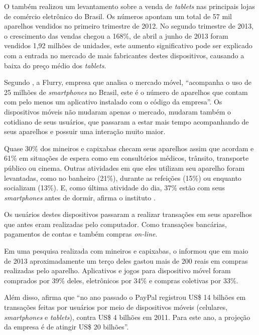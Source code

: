\documentclass[
	12pt,				%
	openright,			%
	oneside,			%
	a4paper,			%
	chapter=TITLE,		%
	section=TITLE,		%
	english,			%
	french,				%
	spanish,			%
	brazil				%
	]{abntex2}
\begin{document}
O  também realizou um levantamento sobre a venda de \textit{tablets} nas principais lojas de comércio eletrônico do Brasil. Os números apontam um total de 57 mil aparelhos vendidos no primeiro trimestre de 2012. No segundo trimestre de 2013, o crescimento das vendas chegou a 168\%, de abril a junho de 2013 foram vendidos 1,92 milhões de unidades, este aumento significativo pode ser explicado com a entrada no mercado de mais fabricantes destes dispositivos, causando a baixa do preço médio dos \textit{tablets}.

Segundo , a Flurry, empresa que analisa o mercado móvel, “acompanha o uso de 25 milhões de \textit{smartphones} no Brasil, este é o número de aparelhos que contam com pelo menos um aplicativo instalado com o código da empresa”. Os dispositivos móveis não mudaram apenas o mercado, mudaram também o cotidiano de seus usuários, que passaram a estar mais tempo acompanhando de seus aparelhos e possuir uma interação muito maior. 

\begin{citacao}
Quase 30\% dos mineiros e capixabas checam seus aparelhos assim que acordam e 61\% em situações de espera como em consultórios médicos, trânsito, transporte público ou cinema. Outras atividades em que eles utilizam seu aparelho foram levantadas, como no banheiro (21\%), durante as refeições (15\%) ou enquanto socializam (13\%). E, como última atividade do dia, 37\% estão com seus \textit{smartphones} antes de dormir, afirma o instituto \cite{ibopeNovosProtagonistas}.
\end{citacao}

Os usuários destes dispositivos passaram a realizar transações em seus aparelhos que antes eram realizadas pelo computador. Como transações bancárias, pagamentos de contas e também compras \textit{on-line}. 

Em uma pesquisa realizada com mineiros e capixabas, o  informou que em maio de 2013 aproximadamente um terço deles gastou mais de 200 reais em compras realizadas pelo aparelho. Aplicativos e jogos para dispositivo móvel foram comprados por 39\% deles, eletrônicos por 34\% e compras coletivas por 33\%. 

Além disso,  afirma que “no ano passado o PayPal registrou US\$ 14 bilhões em transações feitas por usuários por meio de dispositivos móveis (celulares, \textit{smartphones} e \textit{tablets}), contra US\$ 4 bilhões em 2011. Para este ano, a projeção da empresa é de atingir US\$ 20 bilhões”.
\end{document}
